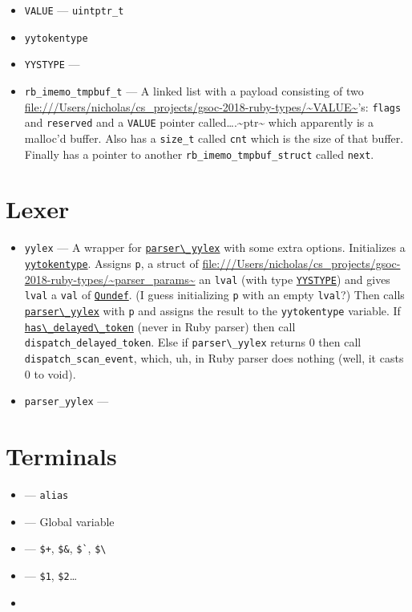 \documentclass[11pt]{article}
\begin{document}
\begin{itemize}
\item \label{VALUE} \verb~VALUE~ --- \verb~uintptr_t~
\item \label{yytokentype} \verb~yytokentype~
\item \label{YYSTYPE} \verb~YYSTYPE~ ---
\item \label{rb_imemo_tmpbuf_t} \verb~rb_imemo_tmpbuf_t~ --- A linked list with a payload consisting of
two \url{file:///Users/nicholas/cs_projects/gsoc-2018-ruby-types/~VALUE~}'s: \verb~flags~ and \verb~reserved~ and a \verb~VALUE~ pointer
called\ldots{}.\textasciitilde{}ptr\textasciitilde{} which apparently is a malloc'd buffer. Also has a
\verb~size_t~ called \verb~cnt~ which is the size of that buffer. Finally has
a pointer to another \verb~rb_imemo_tmpbuf_struct~ called \verb~next~.
\end{itemize}

\section{Lexer}
\label{sec-5}

\begin{itemize}
\item \label{yylex} \verb~yylex~ --- A wrapper for \hyperref[parser_yylex]{\verb~parser\_yylex~} with some extra
options. Initializes a \hyperref[yytokentype]{\verb~yytokentype~}. Assigns \verb~p~, a struct of
\url{file:///Users/nicholas/cs_projects/gsoc-2018-ruby-types/~parser\_params~} an \texttt{\verb~lval~} (with type \hyperref[YYSTYPE]{\verb~YYSTYPE~}) and gives \verb~lval~ a
\verb~val~ of \hyperref[Qundef]{\verb~Qundef~}. (I guess initializing \verb~p~ with an empty \verb~lval~?)
Then calls \hyperref[parser_yylex]{\verb~parser\_yylex~} with \verb~p~ and assigns the result to the
\verb~yytokentype~ variable. If \hyperref[has_delayed_token]{\verb~has\_delayed\_token~} (never in Ruby
parser) then call \verb~dispatch_delayed_token~. Else if \verb~parser\_yylex~
returns 0 then call \verb~dispatch_scan_event~, which, uh, in Ruby parser
does nothing (well, it casts 0 to void).
\item \label{parser_yylex} \verb~parser_yylex~ ---
\end{itemize}

\section{Terminals}
\label{sec-6}
\begin{itemize}
\item \label{kALIAS} --- \verb~alias~
\item \label{tGVAR} --- Global variable
\item \label{tBACK_REF} --- \verb~$+~, \verb~$&~, \verb~$`~, \verb~$\~
\item \label{tNTH_REF} --- \verb~$1~, \verb~$2~\ldots{}
\item 
\end{itemize}
\end{document}
